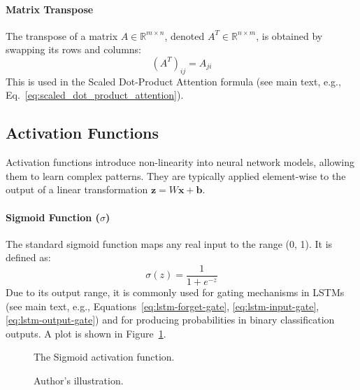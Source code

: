 \begin{appendices}
  \paragraph{Matrix Transpose}
  The transpose of a matrix \( A \in \mathbb{R}^{m \times n} \), denoted \( A^T \in \mathbb{R}^{n \times m} \), is obtained by swapping its rows and columns:
  \begin{equation}
    (A^T)_{ij} = A_{ji}
  \end{equation}
  This is used in the Scaled Dot-Product Attention formula (see main text, e.g., Eq.~\ref{eq:scaled_dot_product_attention}).

  \subsection{Activation Functions}
  \label{subsec:activations_app}
  Activation functions introduce non-linearity into neural network models, allowing them to learn complex patterns. They are typically applied element-wise to the output of a linear transformation $ \bm{z} = W\bm{x} + \bm{b} $.

  \paragraph{Sigmoid Function (\( \sigma \))}
  The standard sigmoid function maps any real input to the range (0, 1). It is defined as:
  \begin{equation}
    \sigma(z) = \frac{1}{1 + e^{-z}}
  \end{equation}
  Due to its output range, it is commonly used for gating mechanisms in LSTMs (see main text, e.g., Equations~\ref{eq:lstm-forget-gate}, \ref{eq:lstm-input-gate}, \ref{eq:lstm-output-gate}) and for producing probabilities in binary classification outputs. A plot is shown in Figure~\ref{fig:sigmoid_plot}.

  \begin{figure}[htbp]
    \centering
    \caption[Sigmoid Activation Function]{The Sigmoid activation function.}
    \label{fig:sigmoid_plot}
    \caption*{Author's illustration.}
  \end{figure}



\end{appendices}
